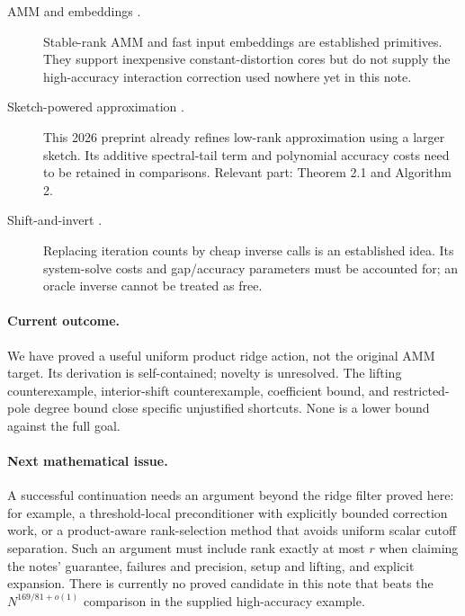 \documentclass[11pt]{article}
\theoremstyle{remark}
\begin{document}
\begin{description}
 \item[AMM and embeddings \cite{cnw,embedding}.]
 Stable-rank AMM and fast input embeddings are established primitives.
 They support inexpensive constant-distortion cores but do not supply the
 high-accuracy interaction correction used nowhere yet in this note.
 \item[Sketch-powered approximation \cite{sketchpower}.]
 This 2026 preprint already refines low-rank approximation using a larger
 sketch. Its additive spectral-tail term and polynomial accuracy costs need
 to be retained in comparisons. Relevant part: Theorem 2.1 and Algorithm 2.
 \item[Shift-and-invert \cite{garber}.]
 Replacing iteration counts by cheap inverse calls is an established idea.
 Its system-solve costs and gap/accuracy parameters must be accounted for;
 an oracle inverse cannot be treated as free.
\end{description}

\paragraph{Current outcome.}
We have proved a useful uniform product ridge action, not the original AMM
target. Its derivation is self-contained; novelty is unresolved. The lifting
counterexample, interior-shift counterexample, coefficient bound, and
restricted-pole degree bound close specific unjustified shortcuts. None is a
lower bound against the full goal.

\paragraph{Next mathematical issue.}
A successful continuation needs an argument beyond the ridge filter proved
here: for example, a threshold-local preconditioner with
explicitly bounded correction work, or a product-aware rank-selection method
that avoids uniform scalar cutoff separation. Such an argument must include
rank exactly at most \(r\) when claiming the notes' guarantee, failures and
precision, setup and lifting, and explicit expansion. There is currently no
proved candidate in this note that beats the \(N^{169/81+o(1)}\) comparison
in the supplied high-accuracy example.
\end{document}
